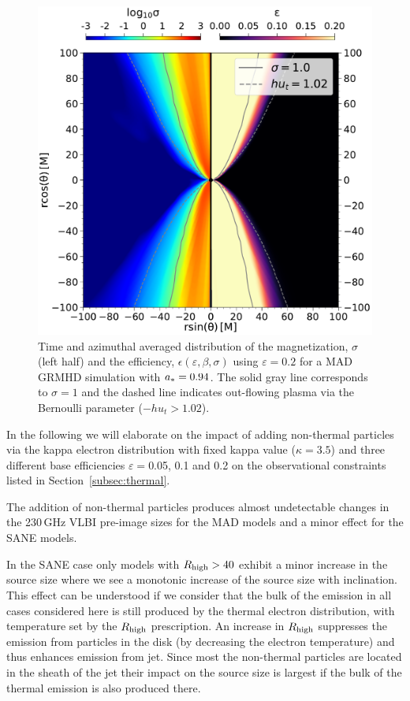 \begin{figure}[t!]
  \centering
    \includegraphics[width=\columnwidth]{./figures/GRMHDphiavera0.94sigmaeta.pdf}
  \caption{Time and azimuthal averaged distribution of the magnetization, $\sigma$ (left half) and the efficiency, $\epsilon(\varepsilon,\beta,\sigma)$ using $\varepsilon=0.2 $ for a \bhac MAD GRMHD simulation with $a_*=0.94$. The solid gray line corresponds to $\sigma=1$ and the dashed line indicates out-flowing plasma via the Bernoulli parameter ($-h u_{t}>1.02$).}
  \label{fig:varepsilon}
\end{figure}

In the following we will elaborate on the impact of adding non-thermal particles via the kappa electron distribution with fixed kappa value ($\kappa=3.5$) and three different base efficiencies $\varepsilon=$0.05, 0.1 and 0.2 on the observational constraints listed in Section~\ref{subsec:thermal}.


The addition of non-thermal particles produces almost undetectable changes in the 230\,GHz VLBI pre-image sizes for the MAD models and a minor effect for the SANE models.

In the SANE case only models with $R_\mathrm{high}>40$ exhibit a minor increase in the source size where we see a monotonic increase of the source size with inclination. This effect can be understood if we consider that the bulk of the emission in all cases considered here is still produced by the thermal electron distribution, with temperature set by the $R_\mathrm{high}$ prescription.  An increase in $R_\mathrm{high}$ suppresses the emission from particles in the disk (by decreasing the electron temperature) and thus enhances emission from jet.  Since most the non-thermal particles are located in the sheath of the jet their impact on the source size is largest if the bulk of the thermal emission is also produced there.

